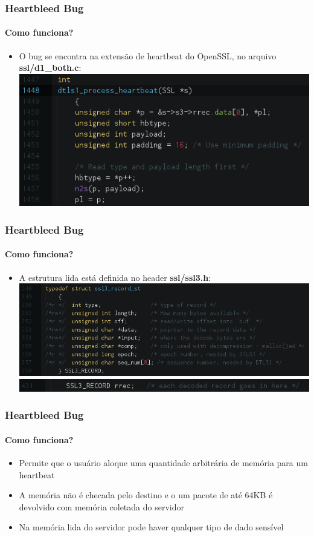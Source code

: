 \documentclass{beamer}
\begin{document}
\begin{frame}
	\frametitle{Heartbleed Bug}
	\framesubtitle{Como funciona?}
	\begin{itemize}
		\item O bug se encontra na extensão de heartbeat do OpenSSL, no arquivo \textbf{ssl/d1\_both.c}:\\
		\includegraphics[scale=0.48]{03_HB1.png}
	\end{itemize}
\end{frame}

\begin{frame}
	\frametitle{Heartbleed Bug}
	\framesubtitle{Como funciona?}
	\begin{itemize}
		\item A estrutura lida está definida no header \textbf{ssl/ssl3.h}:\\
		\includegraphics[scale=0.42]{01_SSL3_RECORD.png}\\\vspace{0.1cm}
		\includegraphics[scale=0.514]{02_rrec.png}
	\end{itemize}
\end{frame}

\begin{frame}
	\frametitle{Heartbleed Bug}
	\framesubtitle{Como funciona?}
	\begin{itemize}
		\item Permite que o usuário aloque uma quantidade arbitrária de memória para um heartbeat
		\item A memória não é checada pelo destino e o um pacote de até 64KB é devolvido com memória coletada do servidor
		\item Na memória lida do servidor pode haver qualquer tipo de dado sensível
	\end{itemize}
\end{frame}
\end{document}
